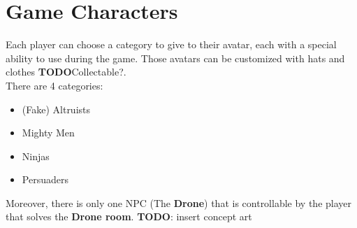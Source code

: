 \section{Game Characters}

Each player can choose a category to give to their avatar, each with a special ability to use during the game. Those avatars can be customized with hats and clothes \textbf{TODO}Collectable?.\\
There are 4 categories:\\
\begin{itemize}
	\item (Fake) Altruists
	\item Mighty Men
	\item Ninjas
	\item Persuaders
\end{itemize}
Moreover, there is only one NPC (The \textbf{Drone}) that is controllable by the player that solves the \textbf{Drone room}.
\textbf{TODO}: insert concept art 








\pagebreak 